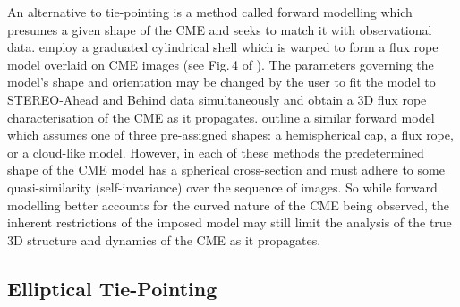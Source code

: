 \documentclass[preprint2]{aastex}
\begin{document}
An alternative to tie-pointing is a method called forward modelling which presumes a given shape of the CME and seeks to match it with observational data. \citet{2006ApJ...652..763T} employ a graduated cylindrical shell which is warped to form a flux rope model overlaid on CME images (see Fig.\,4 of \citet{2009SoPh..256..111T}). The parameters governing the model's shape and orientation may be changed by the user to fit the model to STEREO-Ahead and Behind data simultaneously and obtain a 3D flux rope characterisation of the CME as it propagates. \citet{2009SoPh..256..131B} outline a similar forward model which assumes one of three pre-assigned shapes: a hemispherical cap, a flux rope, or a cloud-like model. However, in each of these methods the predetermined shape of the CME model has a spherical cross-section and must adhere to some quasi-similarity (self-invariance) over the sequence of images. So while forward modelling better accounts for the curved nature of the CME being observed, the inherent restrictions of the imposed model may still limit the analysis of the true 3D structure and dynamics of the CME as it propagates.



\subsection{Elliptical Tie-Pointing}
\label{sect:ellipticaltiepointing}
\end{document}

